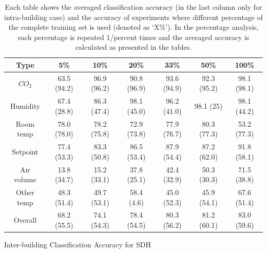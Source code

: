 \begin{table}[ht!]
\centering %
\begin{tabular}{c | c | c | c | c | c | c} \hline
Type & 5\% & 10\% & 20\% & 33\% & 50\% & 100\%\\ %
\hline\hline %
$CO_{2}$ & 63.5 (94.2) & 96.9 (96.2) & 90.8 (96.9) & 93.6 (94.9) & 92.3 (95.2) & 98.1 (98.1)\\ \hline
Humidity & 67.4 (28.8) & 86.3 (47.4) & 98.1 (45.0) & 96.2 (41.0) & 98.1 (25) & 98.1 (44.2)\\ \hline
Room temp & 78.0 (78.0) & 78.2 (75.8) & 72.9 (73.8) & 77.9 (76.7) & 80.3 (77.3) & 53.2 (77.3)\\ \hline
Setpoint & 77.4 (53.3) & 83.3 (50.8) & 86.5 (53.4) & 87.9 (54.4) & 87.2 (62.0) & 91.8 (58.1)\\ \hline
Air volume & 13.8 (34.7) & 15.2 (33.1) & 37.8 (25.1) & 42.4 (32.9) & 50.3 (30.3) & 71.5 (38.8)\\ \hline
Other temp & 48.3 (51.4) & 49.7 (53.1) & 58.4 (4.6) & 45.0 (52.3) & 45.9 (54.1) & 67.6 (51.4)\\ \hline
Overall & 68.2 (55.5) & 74.1 (54.3) & 78.4 (54.5) & 80.3 (56.2) & 81.2 (60.1) & 83.0 (59.6)\\ \hline
\end{tabular}
\caption{Inter-building Classification Accuracy for SDH}
\caption*{Each table shows the averaged classification accuracy (in the last column only for intra-building case) and the accuracy of experiments where different percentage of the complete training set is used (denoted as `X\%'). In the percentage analysis, each percentage is repeated 1/percent times and the averaged accuracy is calculated as presented in the tables.}
\label{table:sdh_x} %
\end{table}

